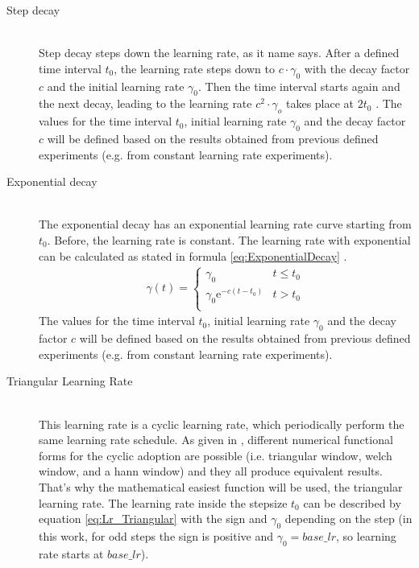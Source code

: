 \documentclass[12pt,DIV14,BCOR12mm,a4paper,footexclude,headinclude,halfparskip-,twoside,openright,cleardoubleempty,idxtotoc,bibtotoc,listtotoc,abstracton]{scrreprt} %
\numberwithin{equation}{chapter}
\begin{document}
\begin{description}
	\begin{description}
		\item[Step decay]\hfill \\Step decay steps down the learning rate, as it name says. After a defined time interval $t_0$, the learning rate steps down to $c\cdot\gamma_0$ with the decay factor $c$ and the initial learning rate $\gamma_0$. Then the time interval starts again and the next decay, leading to the learning rate $c^2\cdot\gamma_o$ takes place at $2t_0$ \cite{LectureNotes_DeepLearning}. The values for the time interval $t_0$, initial learning rate $\gamma_0$ and the decay factor $c$ will be defined based on the results obtained from previous defined experiments (e.g. from constant learning rate experiments).
		\item[Exponential decay]\hfill \\The exponential decay has an exponential learning rate curve starting from $t_0$. Before, the learning rate is constant. The learning rate with exponential can be calculated as stated in formula \ref{eq:ExponentialDecay} \cite{LectureNotes_DeepLearning}.
		\begin{align}
			\gamma(t) = \begin{cases} \gamma_0 & t \leq t_0\\\gamma_0\textrm{e}^{-c(t-t_0)} & t > t_0\\ \end{cases}\label{eq:ExponentialDecay}
		\end{align}
		The values for the time interval $t_0$, initial learning rate $\gamma_0$ and the decay factor $c$ will be defined based on the results obtained from previous defined experiments (e.g. from constant learning rate experiments).
		\item[Triangular Learning Rate]\hfill \\This learning rate is a cyclic learning rate, which periodically perform the same learning rate schedule. As given in \cite{Smith15CyclicLearningRate}, different numerical functional forms for the cyclic adoption are possible (i.e. triangular window, welch window, and a hann window) and they all produce equivalent results. That's why the mathematical easiest function will be used, the triangular learning rate. The learning rate inside the stepsize $t_0$ can be described by equation \ref{eq:Lr_Triangular} with the sign and $\gamma_0$ depending on the step (in this work, for odd steps the sign is positive and $\gamma_0 = base\_lr$, so learning rate starts at $base\_lr$).
		\begin{align}

\end{align}
\end{description}
\end{description}
\end{document}
